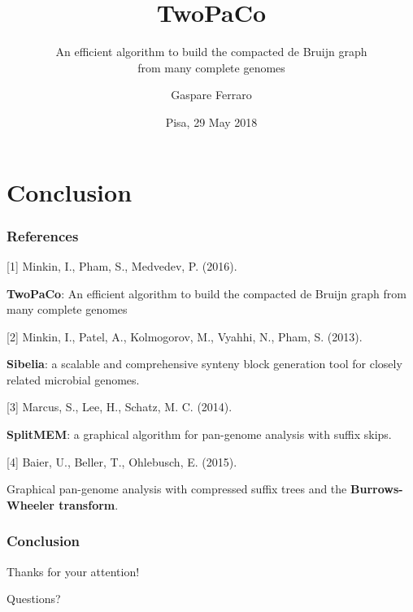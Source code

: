 \documentclass[11pt,svgnames,smaller]{beamer}
\author{Gaspare Ferraro}
\institute[University of Pisa]{University of Pisa\\Department of Computer Science}
\title{TwoPaCo}
\subtitle{An efficient algorithm to build the compacted de Bruijn graph\\from many complete genomes}
\date{Pisa, 29 May 2018}
\begin{document}
	

	\begin{frame} 
	\titlepage
	\end{frame}
			
	
	
	
	
	\section{Conclusion}
	
	\begin{frame}
  \frametitle{References}
  
  [1] Minkin, I., Pham, S., Medvedev, P. (2016). 
  
  \textbf{TwoPaCo}: An efficient algorithm to build the compacted de Bruijn graph from many complete genomes	  

  \medskip
  
  [2] Minkin, I., Patel, A., Kolmogorov, M., Vyahhi, N., Pham, S. (2013). 
  
  \textbf{Sibelia}: a scalable and comprehensive synteny block generation tool for closely related microbial
genomes.

  \medskip
  
  [3] Marcus, S., Lee, H., Schatz, M. C. (2014). 
  
  \textbf{SplitMEM}: a graphical algorithm for pan-genome analysis with suffix skips.

  \medskip

  [4] Baier, U., Beller, T., Ohlebusch, E. (2015). 
  
  Graphical pan-genome analysis with compressed suffix trees and the \textbf{Burrows-Wheeler transform}.

	\end{frame}

	\begin{frame}
		\frametitle{Conclusion}
		\centering
		\Large
		Thanks for your attention!
		
		\bigskip
		
		Questions?
 	\end{frame}
  
\end{document}
